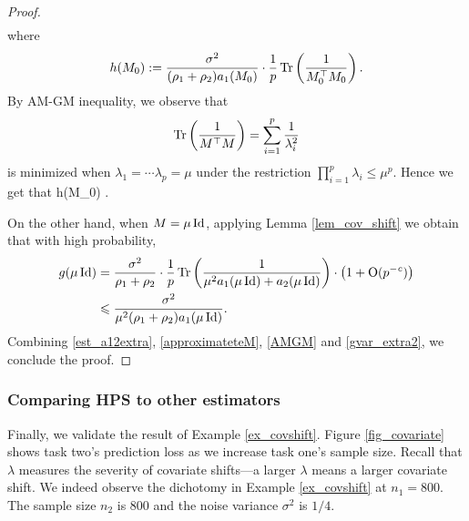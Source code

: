 \begin{example}
\begin{proof}
\begin{align}
    \end{align}
    where
    $$h(M_0):=\frac{\sigma^2}{(\rho_1+\rho_2)a_1(M_0)}\cdot \frac1p\operatorname{Tr}\left( \frac{1}{M_0^\top M_0}\right) .$$
    By AM-GM inequality, we observe that 
    $$\operatorname{Tr}\left( \frac{1}{M^\top M}\right) = \sum_{i=1}^p\frac{1}{\lambda_i^2}$$
    is minimized when $\lambda_1 = \cdots\lambda_p=\mu$ under the restriction $\prod_{i=1}^p\lambda_i\le \mu^p$. Hence we get that 
    \be\label{AMGM} h(M_0) \le {}.\ee
    
    On the other hand, when $M=\mu \operatorname{Id}$, applying Lemma \ref{lem_cov_shift} we obtain that with high probability,
    \begin{align}\label{gvar_extra2}
    \begin{split}
    g(\mu \id)&= \frac{\sigma^2}{\rho_1+\rho_2}\cdot \frac1p\tr\left( \frac{1}{\mu^2 a_1 (\mu\id) + a_2(\mu\id)}\right) \cdot \left(1 +\OO(p^{-\e})\right)\\
    &\le \frac{\sigma^2}{\mu^2(\rho_1+\rho_2)a_1 (\mu\id)}.
    \end{split}
    \end{align}
    Combining \eqref{est_a12extra}, \eqref{approximateteM}, \eqref{AMGM} and \eqref{gvar_extra2}, we conclude the proof.
\end{proof}
\end{example}

\subsubsection{Comparing HPS to other estimators}

Finally, we validate the result of Example \ref{ex_covshift}.
Figure \ref{fig_covariate} shows task two's prediction loss as we increase task one's sample size.
Recall that $\lambda$ measures the severity of covariate shifts---a larger $\lambda$ means a larger covariate shift.
We indeed observe the dichotomy in Example \ref{ex_covshift} at $n_1 = 800$.
The sample size $n_2$ is $800$ and the noise variance $\sigma^2$ is $1/4$.


